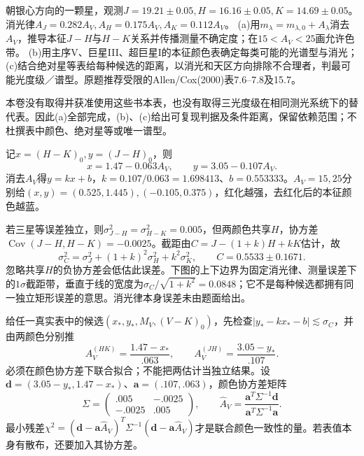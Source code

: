 \begin{exercise}
朝银心方向的一颗星，观测$J=19.21\pm0.05,H=16.16\pm0.05,K=14.69\pm0.05$。消光律$A_J=0.282A_V,A_H=0.175A_V,A_K=0.112A_V$。
(a)用$m_\lambda=m_{\lambda,0}+A_\lambda$消去$A_V$，推导本征$J-H$与$H-K$关系并传播测量不确定度；在$15<A_V<25$画允许色带。
(b)用主序V、巨星III、超巨星I的本征颜色表确定每类可能的光谱型与消光；
(c)结合绝对星等表给每种候选的距离，以消光和天区方向排除不合理者，判最可能光度级／谱型。原题推荐受限的Allen/Cox(2000)表7.6--7.8及15.7。
\end{exercise}
\begin{solution}
本卷没有取得并获准使用这些书本表，也没有取得三光度级在相同测光系统下的替代表。因此(a)全部完成，(b)、(c)给出可复现判据及条件距离，保留依赖范围；不杜撰表中颜色、绝对星等或唯一谱型。

记$x=(H-K)_0,y=(J-H)_0$，则
\[
 x=1.47-0.063A_V,\qquad y=3.05-0.107A_V.
\]
消去$A_V$得$y=kx+b$，$k=0.107/0.063=1.698413$、$b=0.553333$。$A_V=15,25$分别给$(x,y)=(0.525,1.445),(-0.105,0.375)$，红化越强，去红化后的本征颜色越蓝。

若三星等误差独立，则$\sigma_{J-H}^2=\sigma_{H-K}^2=0.005$，但两颜色共享$H$，协方差$\operatorname{Cov}(J-H,H-K)=-0.0025$。截距由$C=J-(1+k)H+kK$估计，故
\[
 \sigma_C^2=\sigma_J^2+(1+k)^2\sigma_H^2+k^2\sigma_K^2,\qquad
 C=0.5533\pm0.1671 .
\]
忽略共享$H$的负协方差会低估此误差。下图的上下边界为固定消光律、测量误差下的$1\sigma$截距带，垂直于线的宽度为$\sigma_C/\sqrt{1+k^2}=0.0848$；它不是每种候选都拥有同一独立矩形误差的意思。消光律本身误差未由题面给出。
\begin{center}
\end{center}

给任一真实表中的候选$(x_*,y_*,M_V,(V-K)_0)$，先检查$|y_*-kx_*-b|\lesssim\sigma_C$，并由两颜色分别推
\[
 A_V^{(HK)}=\frac{1.47-x_*}{.063},\qquad
 A_V^{(JH)}=\frac{3.05-y_*}{.107}.
\]
必须在颜色协方差下联合拟合；不能把两估计当独立结果。设$\boldsymbol d=(3.05-y_*,1.47-x_*)$、$\boldsymbol a=(.107,.063)$，颜色协方差矩阵
\[
 \Sigma=\begin{pmatrix}.005&-.0025\\-.0025&.005\end{pmatrix},\qquad
 \widehat A_V=\frac{\boldsymbol a^T\Sigma^{-1}\boldsymbol d}
 {\boldsymbol a^T\Sigma^{-1}\boldsymbol a}.
\]
最小残差$\chi^2=(\boldsymbol d-\boldsymbol a\widehat A_V)^T\Sigma^{-1}(\boldsymbol d-\boldsymbol a\widehat A_V)$才是联合颜色一致性的量。若表值本身有散布，还要加入其协方差。


\end{solution}
